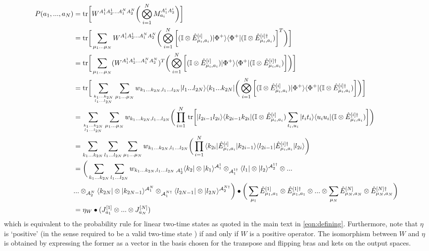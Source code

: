 \documentclass[aps,pra, twocolumn]{revtex4-1}
\begin{document}
\begin{align}
P(a_1,...,a_N)&=\text{tr}\bigg[ W^{A^1_1A^1_2...A^N_1 A^N_2}\bigg(\bigotimes_{i=1}^{N} M_{a_i}^{A^i_1 A^i_2}\bigg)\bigg] \nonumber \\
&=\text{tr}\bigg[\sum_{\mu_1...\mu_N} W^{A^1_1A^1_2...A^N_1 A^N_2} \bigg( \bigotimes_{i=1}^{N} \bigg[ (\mathbb{I}\otimes \hat{E}^{[i]}_{\mu_i, a_i})|\Phi^+ \rangle\langle \Phi^+|(\mathbb{I}\otimes \hat{E}^{[i] \dagger}_{\mu_i, a_i})\bigg]^T\bigg)\bigg] \nonumber\\
&=\text{tr}\bigg[\sum_{\mu_1...\mu_N} (W^{A^1_1A^1_2...A^N_1 A^N_2})^T \bigg( \bigotimes_{i=1}^{N} \bigg[ (\mathbb{I}\otimes \hat{E}^{[i]}_{\mu_i, a_i})|\Phi^+ \rangle\langle \Phi^+|(\mathbb{I}\otimes \hat{E}^{[i] \dagger}_{\mu_i, a_i})\bigg]\bigg)\bigg]\nonumber\\
&=\text{tr}\bigg[\sum_{k_1...k_{2N} \atop l_1...l_{2N}}\sum_{\mu_1...\mu_N} w_{k_1...k_{2N},l_1...l_{2N}}|l_1...l_{2N} \rangle\langle k_1...k_{2N}| \bigg( \bigotimes_{i=1}^{N} \bigg[ (\mathbb{I}\otimes \hat{E}^{[i]}_{\mu_i, a_i})|\Phi^+ \rangle\langle \Phi^+|(\mathbb{I}\otimes \hat{E}^{[i] 
\dagger}_{\mu_i, a_i})\bigg]\bigg)\bigg]\nonumber\\
&=\sum_{k_1...k_{2N} \atop l_1...l_{2N}}\sum_{\mu_1...\mu_N}w_{k_1...k_{2N},l_1...l_{2N}} \bigg( \prod_{i=1}^{N}\, \text{tr} \bigg[ |l_{2i-1}l_{2i}\rangle\langle k_{2i-1}k_{2i}|(\mathbb{I}\otimes \hat{E}^{[i]}_{\mu_i, a_i}) \sum_{t_i, u_i} |t_i t_i\rangle\langle u_i u_i| (\mathbb{I}\otimes \hat{E}^{[i] 
\dagger}_{\mu_i, a_i})\bigg]\bigg)\nonumber\\
&= \sum_{k_1...k_{2N}}\sum_{l_1...l_{2N}}\sum_{\mu_1...\mu_N}w_{k_1...k_{2N},l_1...l_{2N}} \bigg( \prod_{i=1}^{N}\,  \langle k_{2i}|\hat{E}^{[i]}_{\mu_i, a_i}|k_{2i-1}\rangle \langle l_{2i-1}|\hat{E}^{[i] \dagger}_{\mu_i, a_i}|l_{2i}\rangle \bigg)\nonumber\\
&= \bigg(\sum_{k_1...k_{2N}}\sum_{l_1...l_{2N}}w_{k_1...k_{2N},l_1...l_{2N}}    \,_{\mathcal{A}_2^1}\langle k_2| \otimes |k_1\rangle^{\mathcal{A}_1^1} \otimes _{\mathcal{A}_1^{1 \dagger}}\langle l_1| \otimes |l_2\rangle^{\mathcal{A}_2^{1 \dagger}} \otimes ...\nonumber\\ &... \otimes  _{\mathcal{A}_2^{N}}\langle k_{2N}| \otimes |k_{2N-1}\rangle^{\mathcal{A}_1^{N}} \otimes _{\mathcal{A}_1^{N \dagger}}\langle l_{2N-1}|\otimes  |l_{2N}\rangle ^{\mathcal{A}_2^{N \dagger}}\bigg) \bullet \bigg( \sum_{\mu_1} \hat{E}^{[1]}_{\mu_1, a_1}\otimes \hat{E}^{[1] \dagger}_{\mu_1,a_1} \otimes ... \otimes \sum_{\mu_N} \hat{E}^{[N]}_{\mu_N, a_N}\otimes \hat{E}^{[N] \dagger}_{\mu_N, a_N}\bigg)\nonumber\\
&=\eta_W  \bullet (J_{a_1}^{[1]}  \otimes...  \otimes J_{a_N}^{[N]})
\end{align}
which is equivalent to the probability rule for linear two-time states as quoted in the main text in \eqref{eqn:defining}. Furthermore, note that $\eta$ is `positive' (in the sense required to be a valid two-time state \cite{connectingprocesandtwotime}) if and only if $W$ is a positive operator. The isomorphism between $W$ and $\eta$ is obtained by expressing the former as a vector in the basis chosen for the transpose and flipping bras and kets on the output spaces. 
\end{document}
